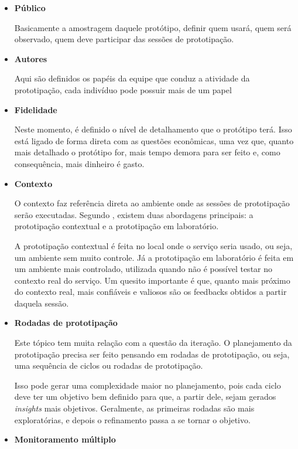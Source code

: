 \begin{itemize}
	\item \textbf{Público}
	
	Basicamente a amostragem daquele protótipo, definir quem usará, quem será observado, quem deve participar das sessões de prototipação.
	
	\item \textbf{Autores}
	
	Aqui são definidos os papéis da equipe que conduz a atividade da prototipação, cada indivíduo pode possuir mais de um papel

\item \textbf{Fidelidade}

Neste momento, é definido o nível de detalhamento que o protótipo terá. Isso está ligado de forma direta com as questões econômicas, uma vez que, quanto mais detalhado o protótipo for, mais tempo demora para ser feito e, como consequência, mais dinheiro é gasto.

\item \textbf{Contexto}

O contexto faz referência direta ao ambiente onde as sessões de prototipação serão executadas. Segundo \cite{Stickdorn2019}, existem duas abordagens principais: a prototipação contextual e a prototipação em laboratório.

A prototipação contextual é feita no local onde o serviço seria usado, ou seja, um ambiente sem muito controle. Já a prototipação em laboratório é feita em um ambiente mais controlado, utilizada quando não é possível testar no contexto real do serviço. Um quesito importante é que, quanto mais próximo do contexto real, mais confiáveis e valiosos são os feedbacks obtidos a partir daquela sessão.

\item \textbf{Rodadas de prototipação}

Este tópico tem muita relação com a questão da iteração. O planejamento da prototipação precisa ser feito pensando em rodadas de prototipação, ou seja, uma sequência de ciclos ou rodadas de prototipação.

Isso pode gerar uma complexidade maior no planejamento, pois cada ciclo deve ter um objetivo bem definido para que, a partir dele, sejam gerados \textit{insights} mais objetivos. Geralmente, as primeiras rodadas são mais exploratórias, e depois o refinamento passa a se tornar o objetivo.

\item \textbf{Monitoramento múltiplo}


\end{itemize}
